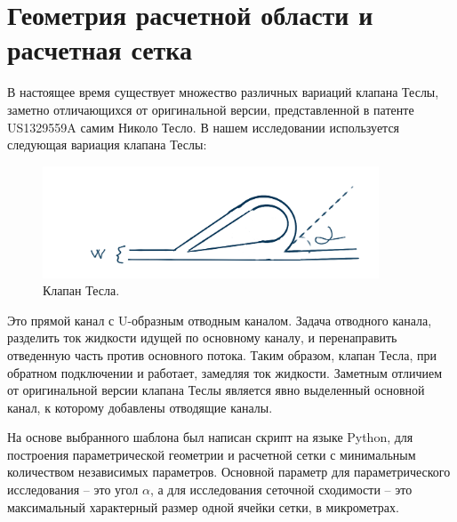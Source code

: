 \documentclass[14pt,a4paper]{article}
\begin{document}
        
    
    \section*{Геометрия расчетной области и расчетная сетка}

        В настоящее время существует множество различных вариаций клапана Теслы, заметно отличающихся от оригинальной версии, представленной в патенте US1329559A самим Николо Тесло. В нашем исследовании используется следующая вариация клапана Теслы:

        \begin{figure}[h!]
            \centering
            \includegraphics[width=100mm,scale=0.5]{teslaValve}
            \caption{Клапан Тесла.}
            \label{fig:TeslaValve}
        \end{figure}
        Это прямой канал с U-образным отводным каналом. Задача отводного канала, разделить ток жидкости идущей по основному каналу, и перенаправить отведенную часть против основного потока. Таким образом, клапан Тесла, при обратном подключении и работает, замедляя ток жидкости. Заметным отличием от оригинальной версии клапана Теслы является явно выделенный основной канал, к которому добавлены отводящие каналы.          
        
        На основе выбранного шаблона был написан скрипт на языке Python, для построения параметрической геометрии и расчетной сетки с минимальным количеством независимых параметров. Основной параметр для параметрического исследования -- это угол $ \alpha  $, а для исследования сеточной сходимости -- это максимальный характерный размер одной ячейки сетки, в микрометрах.
       
\end{document}
